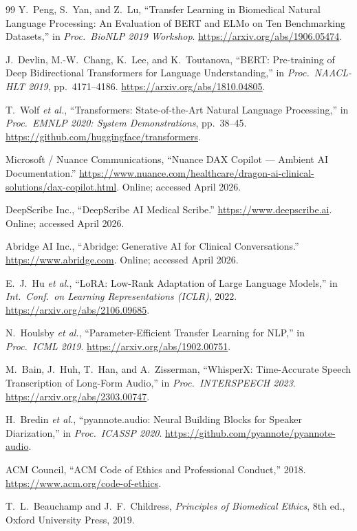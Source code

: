 \documentclass[12pt,a4paper]{article}
\begin{document}
\begin{thebibliography}{99}
Y.~Peng, S.~Yan, and Z.~Lu,
``Transfer Learning in Biomedical Natural Language Processing:
An Evaluation of BERT and ELMo on Ten Benchmarking Datasets,''
in \emph{Proc.\ BioNLP 2019 Workshop}.
\url{https://arxiv.org/abs/1906.05474}.

J.~Devlin, M.-W.~Chang, K.~Lee, and K.~Toutanova,
``BERT: Pre-training of Deep Bidirectional Transformers for
Language Understanding,''
in \emph{Proc.\ NAACL-HLT 2019}, pp.~4171--4186.
\url{https://arxiv.org/abs/1810.04805}.

T.~Wolf \emph{et al.},
``Transformers: State-of-the-Art Natural Language Processing,''
in \emph{Proc.\ EMNLP 2020: System Demonstrations}, pp.~38--45.
\url{https://github.com/huggingface/transformers}.

Microsoft / Nuance Communications,
``Nuance DAX Copilot --- Ambient AI Documentation.''
\url{https://www.nuance.com/healthcare/dragon-ai-clinical-solutions/dax-copilot.html}.
Online; accessed April 2026.

DeepScribe Inc.,
``DeepScribe AI Medical Scribe.''
\url{https://www.deepscribe.ai}. Online; accessed April 2026.

Abridge AI Inc.,
``Abridge: Generative AI for Clinical Conversations.''
\url{https://www.abridge.com}. Online; accessed April 2026.

E.~J.~Hu \emph{et al.},
``LoRA: Low-Rank Adaptation of Large Language Models,''
in \emph{Int.\ Conf.\ on Learning Representations (ICLR)}, 2022.
\url{https://arxiv.org/abs/2106.09685}.

N.~Houlsby \emph{et al.},
``Parameter-Efficient Transfer Learning for NLP,''
in \emph{Proc.\ ICML 2019}.
\url{https://arxiv.org/abs/1902.00751}.

M.~Bain, J.~Huh, T.~Han, and A.~Zisserman,
``WhisperX: Time-Accurate Speech Transcription of Long-Form Audio,''
in \emph{Proc.\ INTERSPEECH 2023}.
\url{https://arxiv.org/abs/2303.00747}.

H.~Bredin \emph{et al.},
``pyannote.audio: Neural Building Blocks for Speaker Diarization,''
in \emph{Proc.\ ICASSP 2020}.
\url{https://github.com/pyannote/pyannote-audio}.

ACM Council,
``ACM Code of Ethics and Professional Conduct,'' 2018.
\url{https://www.acm.org/code-of-ethics}.

T.~L.~Beauchamp and J.~F.~Childress,
\emph{Principles of Biomedical Ethics}, 8th ed.,
Oxford University Press, 2019.


\end{thebibliography}
\end{document}
